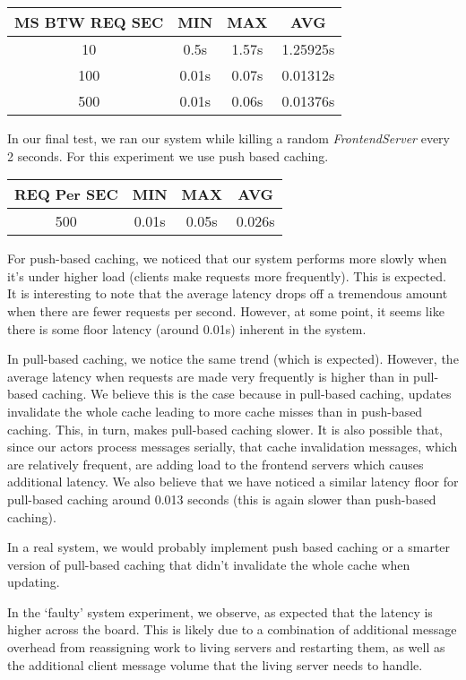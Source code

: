\documentclass[11pt]{article}
\begin{document}
\begin{tabular}{c|c|c|c}
  MS BTW REQ SEC & MIN & MAX & AVG \\
  \hline
  10  & 0.5s  & 1.57s & 1.25925s \\
  100 & 0.01s & 0.07s & 0.01312s \\
  500 & 0.01s & 0.06s & 0.01376s \\
\end{tabular}

In our final test, we ran our system while killing a random
\emph{FrontendServer} every 2 seconds.  For this experiment we use
push based caching.

\begin{tabular}{c|c|c|c}
  REQ Per SEC & MIN & MAX & AVG \\
  \hline
  500  & 0.01s  & 0.05s & 0.026s \\
\end{tabular}

For push-based caching, we noticed that our system performs more
slowly when it's under higher load (clients make requests more
frequently).  This is expected.  It is interesting to note that the
average latency drops off a tremendous amount when there are fewer
requests per second.  However, at some point, it seems like there is some
floor latency (around 0.01s) inherent in the system.

In pull-based caching, we notice the same trend (which is expected).
However, the average latency when requests are made very
frequently is higher than in pull-based caching.  We believe this is
the case because in pull-based caching, updates invalidate the whole
cache leading to more cache misses than in push-based caching.  This,
in turn, makes pull-based caching slower. It is also possible that, 
since our actors process messages serially, that cache invalidation 
messages, which are relatively frequent, are adding load to the 
frontend servers which causes additional latency. We also believe that we
have noticed a similar latency floor for pull-based caching around
0.013 seconds (this is again slower than push-based caching).

In a real system, we would probably implement push based caching or a
smarter version of pull-based caching that didn't invalidate the whole
cache when updating.

In the `faulty' system experiment, we observe, as expected that the 
latency is higher across the board. This is likely due to a combination 
of additional message overhead from reassigning work to living servers 
and restarting them, as well as the additional client message volume that 
the living server needs to handle.
\end{document}
